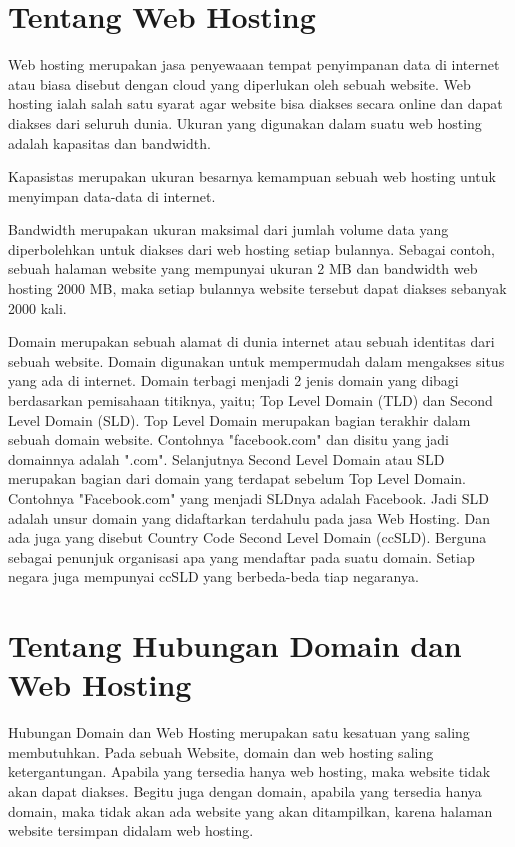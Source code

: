 \documentclass[12pt, a4paper]{article}
\begin{document}
\section{Tentang Web Hosting}
Web hosting merupakan jasa penyewaaan tempat penyimpanan data di internet atau biasa disebut dengan cloud
yang diperlukan oleh sebuah website. Web hosting ialah salah satu syarat agar website bisa diakses secara 
online dan dapat diakses dari seluruh dunia. Ukuran yang digunakan dalam suatu web hosting adalah kapasitas
dan bandwidth. 

Kapasistas merupakan ukuran besarnya kemampuan sebuah web hosting untuk menyimpan data-data di internet.

Bandwidth merupakan ukuran maksimal dari jumlah volume data yang diperbolehkan untuk diakses dari web hosting
setiap bulannya. Sebagai contoh, sebuah halaman website yang mempunyai ukuran 2 MB dan bandwidth web hosting
2000 MB, maka setiap bulannya website tersebut dapat diakses sebanyak 2000 kali.

Domain merupakan sebuah alamat di dunia internet atau sebuah identitas dari sebuah website. Domain digunakan untuk mempermudah dalam mengakses situs yang ada di internet. Domain terbagi menjadi 2 jenis domain yang dibagi berdasarkan pemisahaan titiknya, yaitu; Top Level Domain (TLD) dan Second Level Domain (SLD). Top Level Domain merupakan bagian terakhir dalam sebuah domain website. Contohnya "facebook.com" dan disitu yang jadi domainnya adalah ".com". Selanjutnya Second Level Domain atau SLD merupakan bagian dari domain yang terdapat sebelum Top Level Domain. Contohnya "Facebook.com" yang menjadi SLDnya adalah Facebook. Jadi SLD adalah unsur domain yang didaftarkan terdahulu pada jasa Web Hosting. Dan ada juga yang disebut Country Code Second Level Domain (ccSLD). Berguna sebagai penunjuk organisasi apa yang mendaftar pada suatu domain. Setiap negara juga mempunyai ccSLD yang berbeda-beda tiap negaranya.

\section{Tentang Hubungan Domain dan Web Hosting}
Hubungan Domain dan Web Hosting merupakan satu kesatuan yang saling membutuhkan.
Pada sebuah Website, domain dan web hosting saling ketergantungan. Apabila yang tersedia hanya web hosting, maka website tidak akan dapat diakses. Begitu juga dengan domain, apabila yang tersedia hanya domain, maka tidak akan ada website yang akan ditampilkan, karena halaman website tersimpan didalam web hosting.
\end{document}
